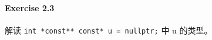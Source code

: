 \documentclass{article}
\begin{document}
	\paragraph*{Exercise 2.3} 
	
	解读 \verb|int *const** const* u = nullptr;| 中 u 的类型。
	
\end{document}

